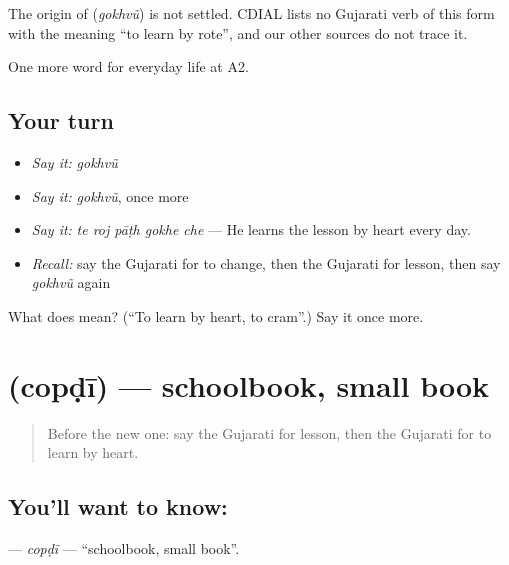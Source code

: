 \begin{cousinweb}
The origin of \textbf{} (\emph{gokhvũ}) is not settled. CDIAL lists no Gujarati verb of this form with the meaning \textquotedblleft{}to learn by rote\textquotedblright{}, and our other sources do not trace it.
\end{cousinweb}

\begin{grammarlens}[title={What you've built}]
One more word for everyday life at A2.
\end{grammarlens}

\subsection*{Your turn}
\begin{itemize}
\raggedright
  \item \emph{Say it:} \emph{gokhvũ}
  \item \emph{Say it:} \emph{gokhvũ}, once more
  \item \emph{Say it:} \emph{te roj pāṭh gokhe che} — He learns the lesson by heart every day.
  \item \emph{Recall:} say the Gujarati for to change, then the Gujarati for lesson, then say \emph{gokhvũ} again
\end{itemize}

\begin{tcolorbox}[breakable,colback=teal!4,colframe=teal!35!black,title={Before you move on}]
What does  mean? (\textquotedblleft{}To learn by heart, to cram\textquotedblright{}.) Say it once more.
\end{tcolorbox}
\section[\texorpdfstring{\gu{ચોપડી} (copḍī)}{ચોપડી (copḍī)}]{ (copḍī) — schoolbook, small book}

\label{lesson:GU-C243-copdi}



\begin{quote}
Before the new one: say the Gujarati for lesson, then the Gujarati for to learn by heart.
\end{quote}

\subsection*{You'll want to know: }
\textbf{} — \emph{copḍī} — \textquotedblleft{}schoolbook, small book\textquotedblright{}.

